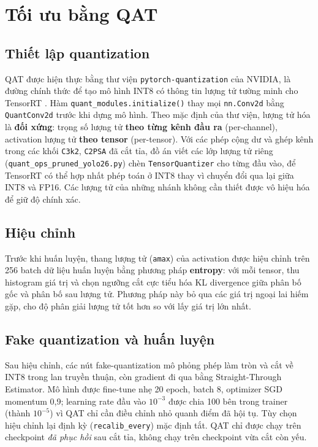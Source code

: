 \section{Tối ưu bằng QAT}

\subsection{Thiết lập quantization}

QAT được hiện thực bằng thư viện \texttt{pytorch-quantization} của NVIDIA, là
đường chính thức để tạo mô hình INT8 có thông tin lượng tử tường minh cho
TensorRT \cite{jacob2018}. Hàm \texttt{quant\_modules.initialize()} thay mọi
\texttt{nn.Conv2d} bằng \texttt{QuantConv2d} trước khi dựng mô hình. Theo mặc định
của thư viện, lượng tử hóa là \textbf{đối xứng}: trọng số lượng tử \textbf{theo
từng kênh đầu ra} (per-channel), activation lượng tử \textbf{theo tensor}
(per-tensor). Với các phép cộng dư và ghép kênh trong các khối
\texttt{C3k2}, \texttt{C2PSA} đã cắt tỉa, đồ án viết các lớp lượng tử riêng
(\texttt{quant\_ops\_pruned\_yolo26.py}) chèn \texttt{TensorQuantizer} cho từng
đầu vào, để TensorRT có thể hợp nhất phép toán ở INT8 thay vì chuyển đổi qua lại
giữa INT8 và FP16. Các lượng tử của những nhánh không cần thiết được vô hiệu hóa
để giữ độ chính xác.

\subsection{Hiệu chỉnh}

Trước khi huấn luyện, thang lượng tử (\texttt{amax}) của activation được hiệu
chỉnh trên 256 batch dữ liệu huấn luyện bằng phương pháp \textbf{entropy}: với
mỗi tensor, thu histogram giá trị và chọn ngưỡng cắt cực tiểu hóa KL divergence
giữa phân bố gốc và phân bố sau lượng tử. Phương pháp này bỏ qua các giá trị
ngoại lai hiếm gặp, cho độ phân giải lượng tử tốt hơn so với lấy giá trị lớn nhất.

\subsection{Fake quantization và huấn luyện}

Sau hiệu chỉnh, các nút fake-quantization mô phỏng phép làm tròn và cắt về INT8
trong lan truyền thuận, còn gradient đi qua bằng Straight-Through Estimator. Mô
hình được fine-tune nhẹ 20 epoch, batch 8, optimizer SGD momentum 0,9; learning
rate đầu vào $10^{-3}$ được chia 100 bên trong trainer (thành $10^{-5}$) vì QAT
chỉ cần điều chỉnh nhỏ quanh điểm đã hội tụ. Tùy chọn hiệu chỉnh lại định kỳ
(\texttt{recalib\_every}) mặc định tắt. QAT chỉ được chạy trên checkpoint \emph{đã
phục hồi} sau cắt tỉa, không chạy trên checkpoint vừa cắt còn yếu.

